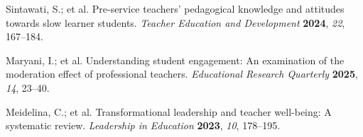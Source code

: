 \documentclass[journal,article,submit,pdftex,moreauthors]{Definitions/mdpi}
\begin{document}
\begin{thebibliography}{999}
 Sintawati, S.; et al. Pre-service teachers' pedagogical knowledge and attitudes towards slow learner students. \textit{Teacher Education and Development} \textbf{2024}, \textit{22}, 167--184.

 Maryani, I.; et al. Understanding student engagement: An examination of the moderation effect of professional teachers. \textit{Educational Research Quarterly} \textbf{2025}, \textit{14}, 23--40.

 Meidelina, C.; et al. Transformational leadership and teacher well-being: A systematic review. \textit{Leadership in Education} \textbf{2023}, \textit{10}, 178--195.

\end{thebibliography}
\end{document}
